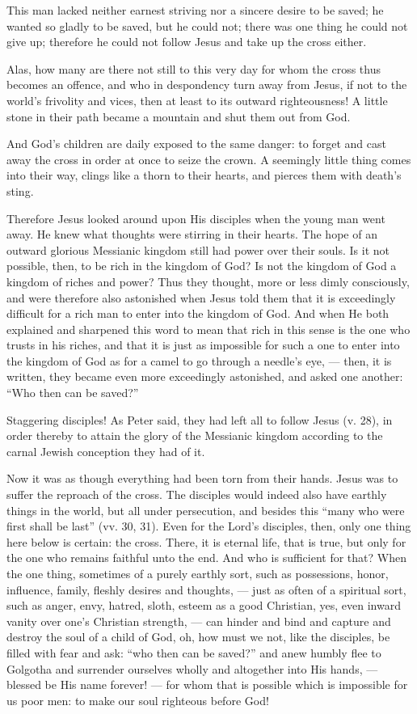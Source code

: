 This man lacked neither earnest striving nor a sincere desire to be saved; he wanted so gladly to be saved, but he could not; there was one thing he could not give up; therefore he could not follow Jesus and take up the cross either.

Alas, how many are there not still to this very day for whom the cross thus becomes an offence, and who in despondency turn away from Jesus, if not to the world’s frivolity and vices, then at least to its outward righteousness! A little stone in their path became a mountain and shut them out from God.

And God’s children are daily exposed to the same danger: to forget and cast away the cross in order at once to seize the crown. A seemingly little thing comes into their way, clings like a thorn to their hearts, and pierces them with death’s sting.

Therefore Jesus looked around upon His disciples when the young man went away. He knew what thoughts were stirring in their hearts. The hope of an outward glorious Messianic kingdom still had power over their souls. Is it not possible, then, to be rich in the kingdom of God? Is not the kingdom of God a kingdom of riches and power? Thus they thought, more or less dimly consciously, and were therefore also astonished when Jesus told them that it is exceedingly difficult for a rich man to enter into the kingdom of God. And when He both explained and sharpened this word to mean that rich in this sense is the one who trusts in his riches, and that it is just as impossible for such a one to enter into the kingdom of God as for a camel to go through a needle’s eye, — then, it is written, they became even more exceedingly astonished, and asked one another: “Who then can be saved?”

Staggering disciples! As Peter said, they had left all to follow Jesus (v. 28), in order thereby to attain the glory of the Messianic kingdom according to the carnal Jewish conception they had of it.

Now it was as though everything had been torn from their hands. Jesus was to suffer the reproach of the cross. The disciples would indeed also have earthly things in the world, but all under persecution, and besides this “many who were first shall be last” (vv. 30, 31). Even for the Lord’s disciples, then, only one thing here below is certain: the cross. There, it is eternal life, that is true, but only for the one who remains faithful unto the end. And who is sufficient for that? When the one thing, sometimes of a purely earthly sort, such as possessions, honor, influence, family, fleshly desires and thoughts, — just as often of a spiritual sort, such as anger, envy, hatred, sloth, esteem as a good Christian, yes, even inward vanity over one’s Christian strength, — can hinder and bind and capture and destroy the soul of a child of God, oh, how must we not, like the disciples, be filled with fear and ask: “who then can be saved?” and anew humbly flee to Golgotha and surrender ourselves wholly and altogether into His hands, — blessed be His name forever! — for whom that is possible which is impossible for us poor men: to make our soul righteous before God!

